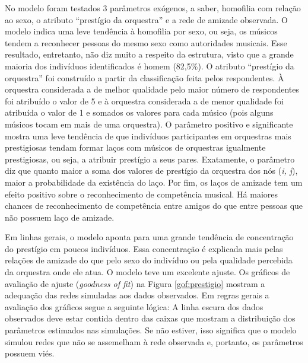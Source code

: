 \documentclass[a4paper, 12pt, openright, oneside, german, french, english, brazil]{abntex2}
\begin{document}
	No modelo foram testados 3 parâmetros exógenos, a saber, homofilia com relação ao sexo, o atributo ``prestígio da orquestra'' e a rede de amizade observada. O modelo indica uma leve tendência à homofilia por sexo, ou seja, os músicos tendem a reconhecer pessoas do mesmo sexo como autoridades musicais. Esse resultado, entretanto, não diz muito a respeito da estrutura, visto que a grande maioria dos indivíduos identificados é homem (82,5\%).	O atributo ``prestígio da orquestra'' foi construído a partir da classificação feita pelos respondentes. À orquestra considerada a de melhor qualidade pelo maior número de respondentes foi atribuído o valor de 5 e à orquestra considerada a de menor qualidade foi atribuída o valor de 1 e somados os valores para cada músico (pois alguns músicos tocam em mais de uma orquestra). O parâmetro positivo e significante mostra uma leve tendência de que indivíduos participantes em orquestras mais prestigiosas tendam formar laços com músicos de orquestras igualmente prestigiosas, ou seja, a atribuir prestígio a seus pares. Exatamente, o parâmetro diz que quanto maior a soma dos valores de prestígio da orquestra dos nós (\textit{i, j}), maior a probabilidade da existência do laço. Por fim, os laços de amizade tem um efeito positivo sobre o reconhecimento de competência musical. Há maiores chances de reconhecimento de competência entre amigos do que entre pessoas que não possuem laço de amizade.
	
	Em linhas gerais, o modelo aponta para uma grande tendência de concentração do prestígio em poucos indivíduos. Essa concentração é explicada mais pelas relações de amizade do que pelo sexo do indivíduo ou pela qualidade percebida da orquestra onde ele atua. O modelo teve um excelente ajuste. Os gráficos de avaliação de ajuste (\textit{goodness of fit}) na Figura \ref{gof:prestigio} mostram a adequação das redes simuladas aos dados observados. Em regras gerais a avaliação dos gráficos segue a seguinte lógica: A linha escura dos dados observados deve estar contida dentro das caixas que mostram a distribuição dos parâmetros estimados nas simulações. Se não estiver, isso significa que o modelo simulou redes que não se assemelham à rede observada e, portanto, os parâmetros possuem viés.
	
\end{document}
